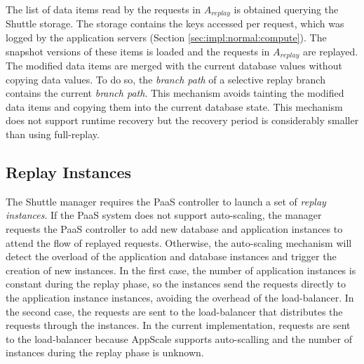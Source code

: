The list of data items read by the requests in $A_{replay}$ is obtained querying the Shuttle storage. The storage contains the keys accessed per request, which was logged by the application servers (Section \ref{sec:impl:normal:compute}). The snapshot versions of these items is loaded and the requests in $A_{replay}$ are replayed. The modified data items are merged with the current database values without copying data values. To do so, the \emph{branch path} of a selective replay branch contains the current \emph{branch path}. This mechanism avoids tainting the modified data items and copying them into the current database state. This mechanism does not support runtime recovery but the recovery period is considerably smaller than using full-replay.



\subsection{Replay Instances}\label{sec:impl:recovery:replay}
The Shuttle manager requires the \ac{PaaS} controller to launch a set of \textit{replay instances}. If the \ac{PaaS} system does not support auto-scaling, the manager requests the \ac{PaaS} controller to add new database and application instances to attend the flow of replayed requests. Otherwise, the auto-scaling mechanism will detect the overload of the application and database instances and trigger the creation of new instances. In the first case, the number of application instances is constant during the replay phase, so the instances send the requests directly to the application instance instances, avoiding the overhead of the load-balancer. In the second case, the requests are sent to the load-balancer that distributes the requests through the instances. In the current implementation, requests are sent to the load-balancer because AppScale supports auto-scalling and the number of instances during the replay phase is unknown.\\

